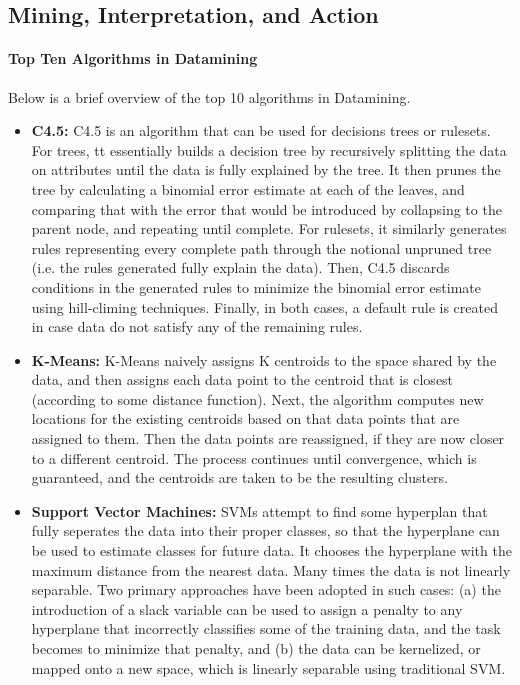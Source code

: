\documentclass[fleqn,10pt]{SelfArx} %
\begin{document}
\subsection{Mining, Interpretation, and Action}

\paragraph{Top Ten Algorithms in Datamining}
Below is a brief overview of the top 10 algorithms in Datamining. \cite{Wu:2007:TAD:1327434.1327436}

\begin{itemize}
	\item{\textbf{C4.5:}} C4.5 is an algorithm that can be used for decisions trees or rulesets. For trees, tt essentially builds a decision tree by recursively splitting the data on attributes until the data is fully explained by the tree.  It then prunes the tree by calculating a binomial error estimate at each of the leaves, and comparing that with the error that would be introduced by collapsing to the parent node, and repeating until complete.  For rulesets, it similarly generates rules representing every complete path through the notional unpruned tree (i.e. the rules generated fully explain the data).  Then, C4.5 discards conditions in the generated rules to minimize the binomial error estimate using hill-climing techniques.  Finally, in both cases, a default rule is created in case data do not satisfy any of the remaining rules.
	\item{\textbf{K-Means:}} K-Means naively assigns K centroids to the space shared by the data, and then assigns each data point to the centroid that is closest (according to some distance function).  Next, the algorithm computes new locations for the existing centroids based on that data points that are assigned to them.  Then the data points are reassigned, if they are now closer to a different centroid.  The process continues until convergence, which is guaranteed, and the centroids are taken to be the resulting clusters.
	\item{\textbf{Support Vector Machines:}} SVMs attempt to find some hyperplan that fully seperates the data into their proper classes, so that the hyperplane can be used to estimate classes for future data.  It chooses the hyperplane with the maximum distance from the nearest data.  Many times the data is not linearly separable.  Two primary approaches have been adopted in such cases: (a) the introduction of a slack variable can be used to assign a penalty to any hyperplane that incorrectly classifies some of the training data, and the task becomes to minimize that penalty, and (b) the data can be kernelized, or mapped onto a new space, which is linearly separable using traditional SVM. 

\end{itemize}
\end{document}
